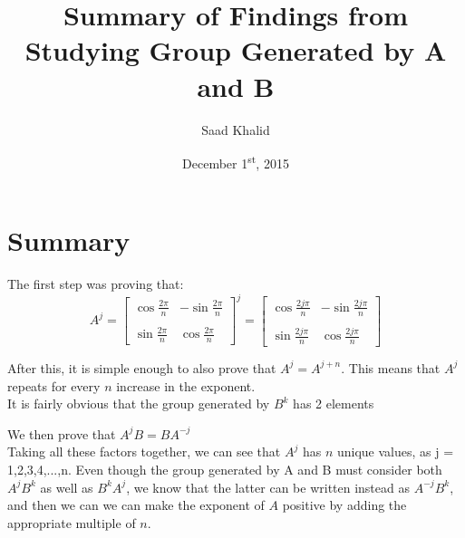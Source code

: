 \documentclass[12pt]{article}
\begin{document}
\title{Summary of Findings from Studying Group Generated by A and B}
\author{Saad Khalid}
\date{December 1\textsuperscript{st}, 2015}

\maketitle

\section*{Summary}

The first step was proving that: \\

\[
	A^j =
	\begin{bmatrix}
		\cos\frac{2\pi}{n} & -\sin\frac{2\pi}{n} \\
		\\
		\sin\frac{2\pi}{n} &  \cos\frac{2\pi}{n}
	\end{bmatrix}^j
	=
	\begin{bmatrix}
		\cos\frac{2j\pi}{n} & -\sin\frac{2j\pi}{n} \\
		\\
		\sin\frac{2j\pi}{n} &  \cos\frac{2j\pi}{n}
	\end{bmatrix}
\]

After this, it is simple enough to also prove that $A^j = A^{j+n}$. This means that $A^j$ repeats for every $n$ increase in the exponent. \\

It is fairly obvious that the group generated by $B^k$ has 2 elements

We then prove that $A^jB = BA^{-j}$ \\

Taking all these factors together, we can see that $A^j$ has $n$ unique values, as j = 1,2,3,4,...,n. Even though the group generated by A and B must consider both $A^jB^k$ as well as $B^kA^j$, we know that the latter can be written instead as $A^{-j}B^k$, and then we can we can make the exponent of $A$ positive by adding the appropriate multiple of $n$.
\end{document}
